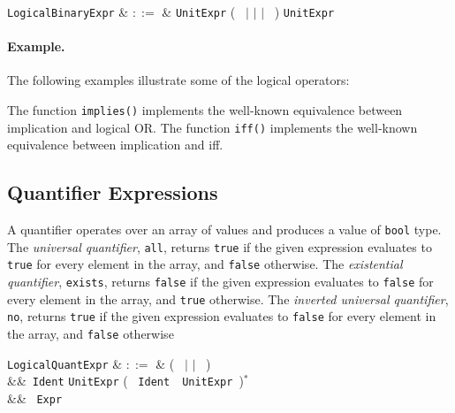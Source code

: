 \begin{syntax}

  \verb+LogicalBinaryExpr+ & $::=$ & \verb+UnitExpr+ \big(\ \token{<==>} $|$ \token{==>} $|$ \token{\&\&} $|$ \token{||}\ \big) \verb+UnitExpr+\\
\end{syntax}

\paragraph{Example.}  The following examples illustrate some of the logical operators:



The function \lstinline{implies()} implements the well-known equivalence between implication and logical OR.  The function \lstinline{iff()} implements the well-known equivalence between implication and iff.


\subsection{Quantifier Expressions}
\label{c_expr_quantifier}

A quantifier operates over an array of values and produces a value of \lstinline{bool} type.  The {\em universal quantifier}, \lstinline{all}, returns \lstinline{true} if the given expression evaluates to \lstinline{true} for every element in the array, and \lstinline{false} otherwise.  The {\em existential quantifier}, \lstinline{exists}, returns \lstinline{false} if the given expression evaluates to \lstinline{false} for every element in the array, and \lstinline{true} otherwise.  The {\em inverted universal quantifier}, \lstinline{no}, returns \lstinline{true} if the given expression evaluates to \lstinline{false} for every element in the array, and \lstinline{false} otherwise

\begin{syntax}
\verb+LogicalQuantExpr+ & $::=$ & \big(\  $|$  $|$
\ \big)\ \token{\{}\\
&&\ \verb+Ident+  \verb+UnitExpr+ \big( \token{,}\ \verb+Ident+\
\ \verb+UnitExpr+\ \big)$^*$\\
&&  \token{|}\ \verb+Expr+\ \token{\}}\\
\end{syntax}

